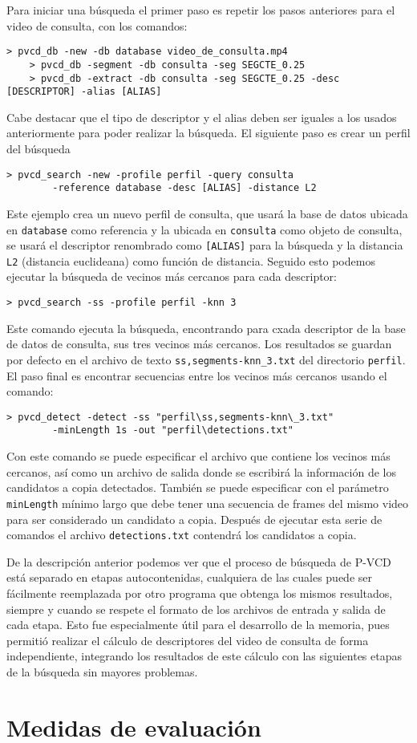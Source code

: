 Para iniciar una búsqueda el primer paso es repetir los pasos anteriores para el video de consulta, con los comandos:
\begin{lstlisting}[style=BashInputStyle]
    > pvcd_db -new -db database video_de_consulta.mp4
    > pvcd_db -segment -db consulta -seg SEGCTE_0.25
    > pvcd_db -extract -db consulta -seg SEGCTE_0.25 -desc [DESCRIPTOR] -alias [ALIAS]
\end{lstlisting}
Cabe destacar que el tipo de descriptor y el alias deben ser iguales a los usados anteriormente para poder realizar la búsqueda. El siguiente paso es crear un perfil del búsqueda
\begin{lstlisting}[style=BashInputStyle]
    > pvcd_search -new -profile perfil -query consulta
        -reference database -desc [ALIAS] -distance L2
\end{lstlisting}
Este ejemplo crea un nuevo perfil de consulta, que usará la base de datos ubicada en \texttt{database} como referencia y la ubicada en \texttt{consulta} como objeto de consulta, se usará el descriptor renombrado como \texttt{[ALIAS]} para la búsqueda y la distancia \texttt{L2} (distancia euclideana) como función de distancia. Seguido esto podemos ejecutar la búsqueda de vecinos más cercanos para cada descriptor:
\begin{lstlisting}[style=BashInputStyle]
    > pvcd_search -ss -profile perfil -knn 3
\end{lstlisting}
Este comando ejecuta la búsqueda, encontrando para cxada descriptor de la base de datos de consulta, sus tres vecinos más cercanos. Los resultados se guardan por defecto en el archivo de texto \texttt{ss,segments-knn\_3.txt} del directorio \texttt{perfil}. El paso final es encontrar secuencias entre los vecinos más cercanos usando el comando:
\begin{lstlisting}[style=BashInputStyle]
    > pvcd_detect -detect -ss "perfil\ss,segments-knn\_3.txt"
        -minLength 1s -out "perfil\detections.txt"
\end{lstlisting}
Con este comando se puede especificar el archivo que contiene los vecinos más cercanos, así como un archivo de salida donde se escribirá la información de los candidatos a copia detectados. También se puede especificar con el parámetro \texttt{minLength} mínimo largo que debe tener una secuencia de frames del mismo video para ser considerado un candidato a copia. Después de ejecutar esta serie de comandos el archivo \texttt{detections.txt} contendrá los candidatos a copia.

De la descripción anterior podemos ver que el proceso de búsqueda de P-VCD está separado en etapas autocontenidas, cualquiera de las cuales puede ser fácilmente reemplazada por otro programa que obtenga los mismos resultados, siempre y cuando se respete el formato de los archivos de entrada y salida de cada etapa. Esto fue especialmente útil para el desarrollo de la memoria, pues permitió realizar el cálculo de descriptores del video de consulta de forma independiente, integrando los resultados de este cálculo con las siguientes etapas de la búsqueda sin mayores problemas. 

\section{Medidas de evaluación}

